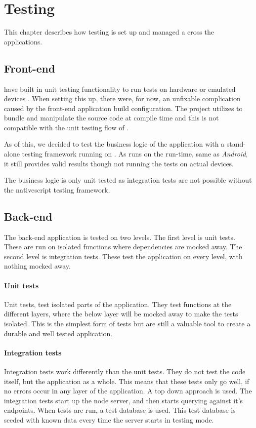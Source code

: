 \chapter{Testing}
This chapter describes how testing is set up and managed a cross the applications.

\section{Front-end}
 have built in unit testing functionality to run tests on hardware or emulated devices \citep{testing:nativescript}.
When setting this up, there were, for now, an unfixable complication caused by the front-end application build configuration.
The project utilizes  to bundle and manipulate the source code at compile time and this is not compatible with the  unit testing flow of .

As of this, we decided to test the business logic of the application with a stand-alone testing framework running on .
As  runs on the  run-time, same as \textit{Android}, it still provides valid results though not running the tests on actual devices.

The business logic is only unit tested as integration tests are not possible without the \gls{nativescript} testing framework.

\section{Back-end}
The back-end application is tested on two levels.
The first level is unit tests.
These are run on isolated functions where dependencies are mocked away.
The second level is integration tests.
These test the application on every level, with nothing mocked away. 

\subsubsection{Unit tests}
Unit tests, test isolated parts of the application. 
They test functions at the different layers, where the below layer will be mocked away to make the tests isolated.
This is the simplest form of tests but are still a valuable tool to create a durable and well tested application.

\subsubsection{Integration tests}
Integration tests work differently than the unit tests. 
They do not test the code itself, but the application as a whole. 
This means that these tests only go well, if no errors occur in any layer of the application. 
A top down approach is used.
The integration tests start up the node server, and then starts querying against it's endpoints. 
When tests are run, a test database is used. This test database is seeded with known data every time the server starts in testing mode.

